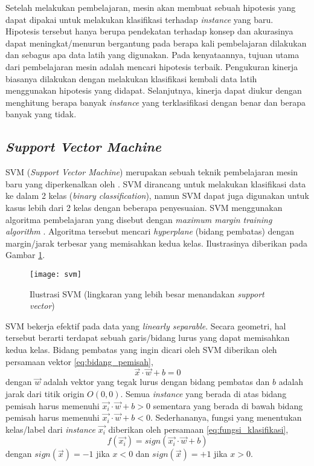 \documentclass[../main/main.tex]{subfiles}
\begin{document}
Setelah melakukan pembelajaran, mesin akan membuat sebuah \gls{hipotesis} yang dapat dipakai untuk melakukan klasifikasi terhadap \textit{instance} yang baru. Hipotesis tersebut hanya berupa pendekatan terhadap konsep dan akurasinya dapat meningkat/menurun bergantung pada berapa kali pembelajaran dilakukan dan sebagus apa data latih yang digunakan. Pada kenyataannya, tujuan utama dari pembelajaran mesin adalah mencari hipotesis terbaik. Pengukuran kinerja biasanya dilakukan dengan melakukan klasifikasi kembali data latih menggunakan hipotesis yang didapat. Selanjutnya, kinerja dapat diukur dengan menghitung berapa banyak \textit{instance} yang terklasifikasi dengan benar dan berapa banyak yang tidak.

\subsection{\textit{Support Vector Machine}}
SVM (\textit{Support Vector Machine}) merupakan sebuah teknik pembelajaran mesin baru yang diperkenalkan oleh \textcite{boser}. SVM dirancang untuk melakukan klasifikasi data ke dalam 2 kelas (\textit{binary classification}), namun SVM dapat juga digunakan untuk kasus lebih dari 2 kelas dengan beberapa penyesuaian. SVM menggunakan algoritma pembelajaran yang disebut dengan \textit{maximum margin training algorithm} \parencite{boser}. Algoritma tersebut mencari \textit{hyperplane} (bidang pembatas) dengan margin/jarak terbesar yang memisahkan kedua kelas. Ilustrasinya diberikan pada Gambar \ref{gbr:studi_svm}.

\begin{figure}[htbp]
	\centering
	\texttt{[image: svm]}
	\caption{Ilustrasi SVM (lingkaran yang lebih besar menandakan \textit{support vector})}
	\label{gbr:studi_svm}
\end{figure}

SVM bekerja efektif pada data yang \textit{linearly separable}. Secara geometri, hal tersebut berarti terdapat sebuah garis/bidang lurus yang dapat memisahkan kedua kelas. Bidang pembatas yang ingin dicari oleh SVM diberikan oleh persamaan vektor \ref{eq:bidang_pemisah},
\begin{equation} \label{eq:bidang_pemisah}
\vec{x} \cdot \vec{w} + b = 0
\end{equation}
dengan $\vec{w}$ adalah vektor yang tegak lurus dengan bidang pembatas dan $b$ adalah jarak dari titik origin $O(0,0)$. Semua \textit{instance} yang berada di atas bidang pemisah harus memenuhi $\vec{x_i} \cdot \vec{w} + b > 0$ sementara yang berada di bawah bidang pemisah harus memenuhi $\vec{x_i} \cdot \vec{w} + b < 0$. Sederhananya, fungsi yang menentukan kelas/label dari \textit{instance} $\vec{x_i}$ diberikan oleh persamaan \ref{eq:fungsi_klasifikasi},
\begin{equation} \label{eq:fungsi_klasifikasi}
f(\vec{x_i}) = sign(\vec{x_i} \cdot \vec{w} + b)
\end{equation}
dengan $sign(\vec{x}) = -1$ jika $x < 0$ dan $sign(\vec{x}) = +1$ jika $x > 0$.
\end{document}
